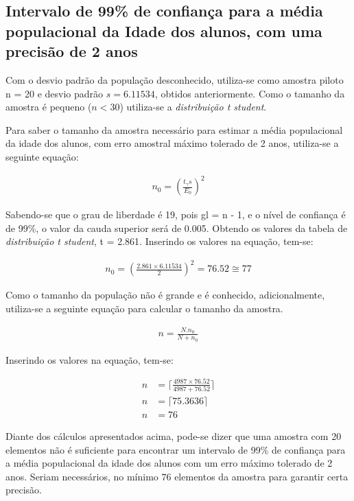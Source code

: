 \subsection{Intervalo de 99\% de confiança para a média populacional da Idade dos alunos, com uma precisão de 2 anos}

	Com o desvio padrão da população desconhecido, utiliza-se como amostra
	piloto n = 20 e desvio padrão $s = \num{6,11534}$, obtidos anteriormente. Como o
	tamanho da amostra é pequeno ($n < 30$) utiliza-se a
	\textit{distribuição t student}.

	Para saber o tamanho da amostra necessário para estimar a média
	populacional da idade dos alunos, com erro amostral máximo tolerado de 2
	anos, utiliza-se a seguinte equação:

	\begin{align*}
		 n_0 = \left (\frac{t_\gamma s}{E_0} \right)^2
	\end{align*}

	Sabendo-se que o grau de liberdade é 19, pois gl = n - 1, e o nível de
	confiança é de 99\%, o valor da cauda superior será de \num{0,005}. Obtendo os
	valores da tabela de \textit{distribuição t student}, t = \num{2,861}.
	Inserindo os valores na equação, tem-se:

	\begin{align*}
		n_0 = \left (\frac{\num{2,861} \times \num{6,11534}}{2} \right)^2 = \num{76,52} \cong 77
	\end{align*}

	Como o tamanho da população não é grande e é conhecido, adicionalmente,
	utiliza-se a seguinte equação para calcular o tamanho da amostra.

	\begin{align*}
		n = \frac{N . n_0}{N + n_0}
	\end{align*}

	Inserindo os valores na equação, tem-se:

	\begin{align*}
		n &= \lceil \frac{4987 \times \num{76,52}}{4987 + \num{76,52}} \rceil \\
		n &= \lceil \num{75,3636} \rceil \\
		n &= 76
	\end{align*}

	Diante dos cálculos apresentados acima, pode-se dizer que uma amostra
	com 20 elementos não é suficiente para encontrar um intervalo de 99\% de
	confiança para a média populacional da idade dos alunos com um erro
	máximo tolerado de 2 anos. Seriam necessários, no mínimo $76$ elementos da
	amostra para garantir certa precisão. 

